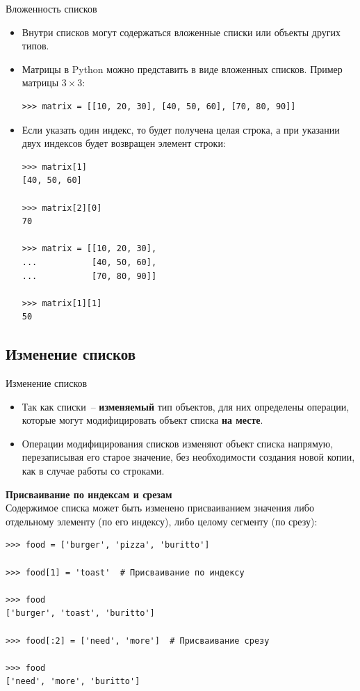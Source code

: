 \documentclass[aspectratio=169, mathserif]{beamer}%
\begin{document}
\begin{frame}[fragile]{Вложенность списков}
\scriptsize
\begin{itemize}
\item Внутри списков могут содержаться вложенные списки или объекты других типов.
\item Матрицы в Python можно представить в виде вложенных списков.
Пример матрицы $3 \times 3$:

\begin{verbatim}
>>> matrix = [[10, 20, 30], [40, 50, 60], [70, 80, 90]]
\end{verbatim}
\item Если указать один индекс, то будет получена целая строка, а при указании двух индексов будет возвращен элемент строки:

\begin{verbatim}
>>> matrix[1]
[40, 50, 60]

>>> matrix[2][0]
70

>>> matrix = [[10, 20, 30],
...           [40, 50, 60],
...           [70, 80, 90]]

>>> matrix[1][1]
50
\end{verbatim}
\end{itemize}
\vfill
\end{frame}


\subsection{Изменение списков}

\begin{frame}[fragile]{Изменение списков}
\scriptsize
\begin{itemize}
\item Так как списки~-- \textcolor{extraorange}{\textbf{изменяемый}} тип объектов, для них определены операции, которые могут модифицировать объект списка \textcolor{extraorange}{\textbf{на месте}}.

\item Операции модифицирования списков изменяют объект списка напрямую, перезаписывая его старое значение, без необходимости создания новой копии, как в случае работы со строками.
\end{itemize}

\alert{\textbf{Присваивание по индексам и срезам}}
\\
Содержимое списка может быть изменено присваиванием значения либо отдельному элементу (по его индексу), либо целому сегменту (по срезу):

\begin{verbatim}
>>> food = ['burger', 'pizza', 'buritto']

>>> food[1] = 'toast'  # Присваивание по индексу

>>> food
['burger', 'toast', 'buritto']

>>> food[:2] = ['need', 'more']  # Присваивание срезу

>>> food
['need', 'more', 'buritto']
\end{verbatim}
\vfill
\end{frame}
\end{document}

